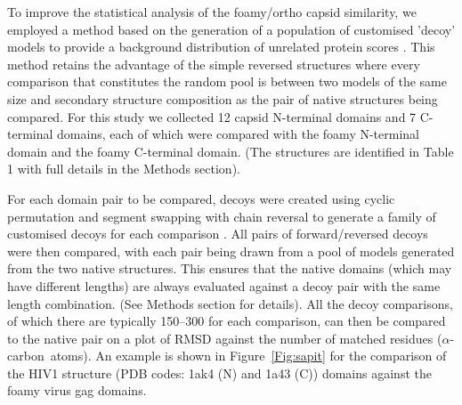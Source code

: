 \documentclass[preprint,12pt]{elsarticle}
\newcommand{\CA}{$\alpha$-carbon}
\newcommand{\Fig}[1]{Figure~\ref{Fig:#1}}
\begin{document}
To improve the statistical analysis of the foamy/ortho capsid similarity, we employed a method
based on the generation of a population of customised 'decoy' models to provide a background distribution
of unrelated protein scores \cite{TaylorWR06a}.  This method retains the advantage of the simple
reversed structures where every comparison that constitutes the random pool is between two models
of the same size and secondary structure composition as the pair of native structures being compared.
For this study we collected 12 capsid N-terminal domains and 7 C-terminal domains, each of which
were compared with the foamy N-terminal domain and the foamy C-terminal domain.
(The structures are identified in Table 1 with full details in the Methods section).

For each domain pair to be compared, decoys were created using cyclic permutation and segment
swapping with chain reversal to generate a family of customised decoys for each comparison
\cite{TaylorWR06a}.  All pairs of forward/reversed decoys were then compared, with each pair being
drawn from a pool of models generated from the two native structures.  This ensures that the native
domains (which may have different lengths) are always evaluated against a decoy pair with the same
length combination.   (See Methods section for details).   All the decoy comparisons, of which
there are typically 150--300 for each comparison,  can then be compared to the native pair on a
plot of RMSD against the number of matched residues (\CA\ atoms).   An example is shown in
\Fig{sapit} for the comparison of the HIV1 structure (PDB codes: 1ak4 (N) and 1a43 (C)) domains
against the foamy virus gag domains.
\end{document}
